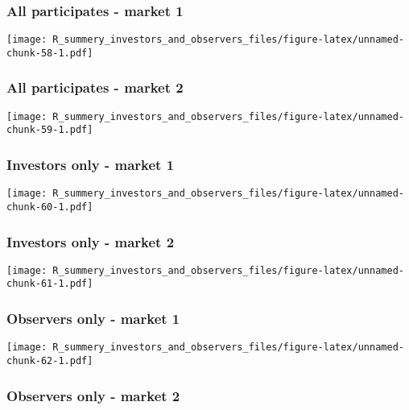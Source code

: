 \documentclass[]{article}
\begin{document}
\hypertarget{all-participates---market-1-4}{%
\subsubsection{All participates - market
1}\label{all-participates---market-1-4}}

\texttt{[image: R\_summery\_investors\_and\_observers\_files/figure-latex/unnamed-chunk-58-1.pdf]}

\hypertarget{all-participates---market-2-4}{%
\subsubsection{All participates - market
2}\label{all-participates---market-2-4}}

\texttt{[image: R\_summery\_investors\_and\_observers\_files/figure-latex/unnamed-chunk-59-1.pdf]}

\hypertarget{investors-only---market-1-4}{%
\subsubsection{Investors only - market
1}\label{investors-only---market-1-4}}

\texttt{[image: R\_summery\_investors\_and\_observers\_files/figure-latex/unnamed-chunk-60-1.pdf]}

\hypertarget{investors-only---market-2-4}{%
\subsubsection{Investors only - market
2}\label{investors-only---market-2-4}}

\texttt{[image: R\_summery\_investors\_and\_observers\_files/figure-latex/unnamed-chunk-61-1.pdf]}

\hypertarget{observers-only---market-1-4}{%
\subsubsection{Observers only - market
1}\label{observers-only---market-1-4}}

\texttt{[image: R\_summery\_investors\_and\_observers\_files/figure-latex/unnamed-chunk-62-1.pdf]}

\hypertarget{observers-only---market-2-4}{%
\subsubsection{Observers only - market
2}\label{observers-only---market-2-4}}
\end{document}
